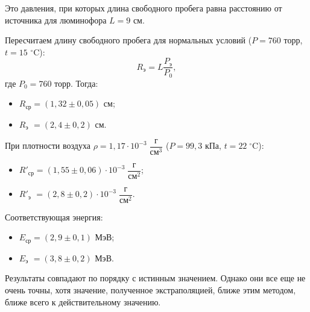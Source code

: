 \documentclass{article}
\begin{document}
Это давления, при которых длина свободного пробега равна расстоянию от источника для люминофора $L = 9$ см. 
		
		Пересчитаем длину свободного пробега для нормальных условий ($P = 760$ торр, $t = 15$ $^\circ$C):
		\begin{equation*}
			R_\text{э} = L\frac{P_\text{э}}{P_0}, 
		\end{equation*}
		\noindent где $P_0 = 760$ торр. Тогда:
		
		\begin{itemize}
			\item $R_\text{ср} = (1,32 \pm 0,05) \text{ см}$;
			
			
			\item $R_\text{э} \,\, = (2,4 \pm 0,2) \text{ см}$.
		\end{itemize}
		
		При плотности воздуха $\rho = 1,17 \cdot 10^{-3} \;\dfrac{\text{г}}{\text{см}^3}$ ($P = 99,3 \text{ кПа}$, $t = 22\;^\circ \text{C}$):
		\begin{itemize}
			\item $R'_\text{ср} = (1,55 \pm 0,06) \cdot 10^{-3} \;\dfrac{\text{г}}{\text{см}^2}$;
			
			
			\item $R'_\text{э} \,\, = (2,8 \pm 0,2) \cdot 10^{-3} \;\dfrac{\text{г}}{\text{см}^2}$.
		\end{itemize}
		
		Соответствующая энергия:
		\begin{itemize}
			\item $E_\text{ср} = (2,9 \pm 0,1) \text{ МэВ}$;
			
			\item $E_\text{э} \,\, = (3,8 \pm 0,2) \text{ МэВ}$.
		\end{itemize}
	
		Результаты совпадают по порядку с истинным значением. Однако они все еще не очень точны, хотя значение, полученное экстраполяцией, ближе этим методом, ближе всего к действительному значению. 
\end{document}
